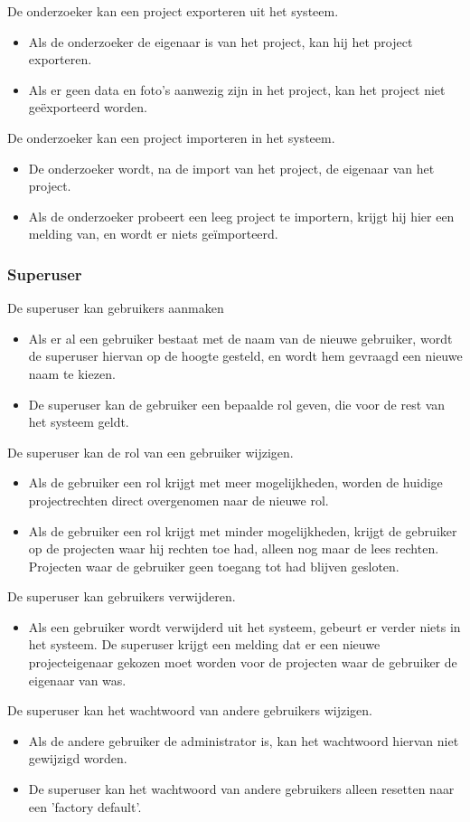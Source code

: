 De onderzoeker kan een project exporteren uit het systeem.
\begin{itemize}
	\item Als de onderzoeker de eigenaar is van het project, kan hij het project exporteren.
	\item Als er geen data en foto's aanwezig zijn in het project, kan het project niet ge\"exporteerd worden.
\end{itemize}

De onderzoeker kan een project importeren in het systeem.
\begin{itemize}
	\item De onderzoeker wordt, na de import van het project, de eigenaar van het project.
	\item Als de onderzoeker probeert een leeg project te importern, krijgt hij hier een melding van, en wordt er niets ge\"importeerd.
\end{itemize}

\subsubsection{Superuser}

De superuser kan gebruikers aanmaken
\begin{itemize}
	\item Als er al een gebruiker bestaat met de naam van de nieuwe gebruiker, wordt de superuser hiervan op de hoogte gesteld, en wordt hem gevraagd een nieuwe naam te kiezen.
	\item De superuser kan de gebruiker een bepaalde rol geven, die voor de rest van het systeem geldt.
\end{itemize}

De superuser kan de rol van een gebruiker wijzigen.
\begin{itemize}
	\item Als de gebruiker een rol krijgt met meer mogelijkheden, worden de huidige projectrechten direct overgenomen naar de nieuwe rol.
	\item Als de gebruiker een rol krijgt met minder mogelijkheden, krijgt de gebruiker op de projecten waar hij rechten toe had, alleen nog maar de lees rechten. Projecten waar de gebruiker geen toegang tot had blijven gesloten.
\end{itemize}

De superuser kan gebruikers verwijderen.
\begin{itemize}
	\item Als een gebruiker wordt verwijderd uit het systeem, gebeurt er verder niets in het systeem. De superuser krijgt een melding dat er een nieuwe projecteigenaar gekozen moet worden voor de projecten waar de gebruiker de eigenaar van was.
\end{itemize}

De superuser kan het wachtwoord van andere gebruikers wijzigen.
\begin{itemize}
	\item Als de andere gebruiker de administrator is, kan het wachtwoord hiervan niet gewijzigd worden.
	\item De superuser kan het wachtwoord van andere gebruikers alleen resetten naar een 'factory default'.
\end{itemize}